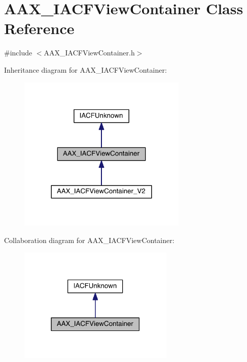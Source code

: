 \hypertarget{a00084}{}\section{A\+A\+X\+\_\+\+I\+A\+C\+F\+View\+Container Class Reference}
\label{a00084}


{\ttfamily \#include $<$A\+A\+X\+\_\+\+I\+A\+C\+F\+View\+Container.\+h$>$}



Inheritance diagram for A\+A\+X\+\_\+\+I\+A\+C\+F\+View\+Container\+:
\nopagebreak
\begin{figure}[H]
\begin{center}
\leavevmode
\includegraphics[width=228pt]{a00595}
\end{center}
\end{figure}


Collaboration diagram for A\+A\+X\+\_\+\+I\+A\+C\+F\+View\+Container\+:
\nopagebreak
\begin{figure}[H]
\begin{center}
\leavevmode
\includegraphics[width=210pt]{a00596}
\end{center}
\end{figure}


